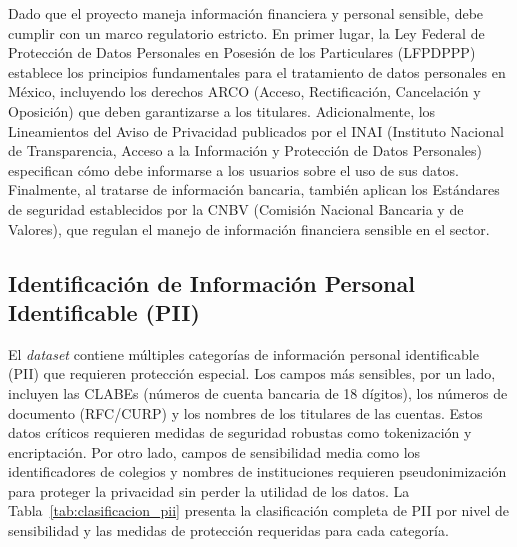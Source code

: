 Dado que el proyecto maneja información financiera y personal sensible, debe cumplir con un marco regulatorio estricto. En primer lugar, la Ley Federal de Protección de Datos Personales en Posesión de los Particulares (LFPDPPP) establece los principios fundamentales para el tratamiento de datos personales en México, incluyendo los derechos ARCO (Acceso, Rectificación, Cancelación y Oposición) que deben garantizarse a los titulares. Adicionalmente, los Lineamientos del Aviso de Privacidad publicados por el INAI (Instituto Nacional de Transparencia, Acceso a la Información y Protección de Datos Personales) especifican cómo debe informarse a los usuarios sobre el uso de sus datos. Finalmente, al tratarse de información bancaria, también aplican los Estándares de seguridad establecidos por la CNBV (Comisión Nacional Bancaria y de Valores), que regulan el manejo de información financiera sensible en el sector.

\subsection{Identificación de Información Personal Identificable (PII)}

El \textit{dataset} contiene múltiples categorías de información personal identificable (PII) \cite{nist_pii} que requieren protección especial. Los campos más sensibles, por un lado, incluyen las CLABEs (números de cuenta bancaria de 18 dígitos), los números de documento (RFC/CURP) y los nombres de los titulares de las cuentas. Estos datos críticos requieren medidas de seguridad robustas como tokenización y encriptación. Por otro lado, campos de sensibilidad media como los identificadores de colegios y nombres de instituciones requieren pseudonimización para proteger la privacidad sin perder la utilidad de los datos. La Tabla~\ref{tab:clasificacion_pii} presenta la clasificación completa de PII por nivel de sensibilidad y las medidas de protección requeridas para cada categoría.

